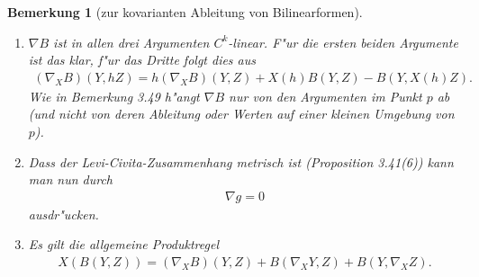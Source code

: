 \documentclass[10pt,a4paper]{article}
\newcommand{\fc}[1]{\special{fc=#1}}
\newtheorem{bem}[sat]{Bemerkung}
\begin{document}
\fc{Bzkovabl}
\begin{bem}[zur kovarianten Ableitung von Bilinearformen]
\begin{enumerate}
\item $\nabla B$ ist in allen drei Argumenten $C^k$-linear. F"ur die ersten beiden Argumente ist das klar, f"ur das Dritte folgt dies aus
\begin{align*}
(\nabla_X B)(Y,hZ) = h(\nabla_X B)(Y,Z) + X(h)B(Y,Z) - B(Y,X(h)Z).
\end{align*}
Wie in Bemerkung 3.49 h"angt $\nabla B$ nur von den Argumenten im Punkt $p$ ab (und nicht von deren Ableitung oder Werten auf einer kleinen Umgebung von $p$).
\item Dass der Levi-Civita-Zusammenhang metrisch ist (Proposition 3.41(6)) kann man nun durch
\begin{align*}
 \nabla g = 0
\end{align*}
ausdr"ucken.
\item
Es gilt die allgemeine Produktregel
\begin{align*}
 X(B(Y,Z)) = (\nabla_X B)(Y,Z) + B(\nabla_X Y,Z) + B(Y,\nabla_X Z).
\end{align*}
\end{enumerate}



\end{bem}
\end{document}
